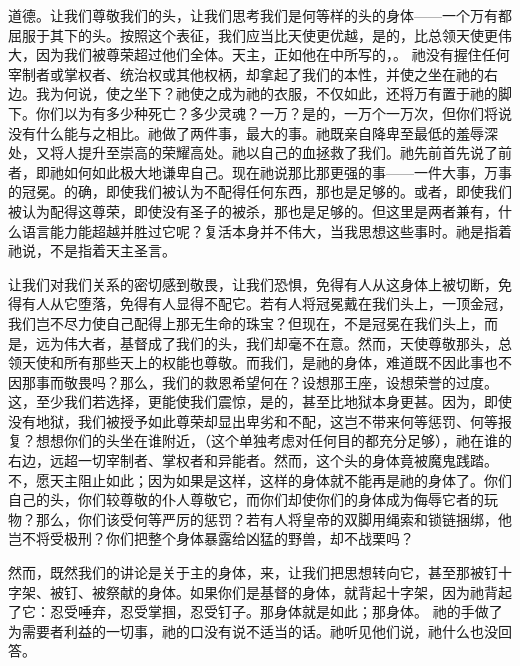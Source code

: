 道德。让我们尊敬我们的头，让我们思考我们是何等样的头的身体——一个万有都屈服于其下的头。按照这个表征，我们应当比天使更优越，是的，比总领天使更伟大，因为我们被尊荣超过他们全体。天主，正如他在中所写的，。 祂没有握住任何宰制者或掌权者、统治权或其他权柄，却拿起了我们的本性，并使之坐在祂的右边。我为何说，使之坐下？祂使之成为祂的衣服，不仅如此，还将万有置于祂的脚下。你们以为有多少种死亡？多少灵魂？一万？是的，一万个一万次，但你们将说没有什么能与之相比。祂做了两件事，最大的事。祂既亲自降卑至最低的羞辱深处，又将人提升至崇高的荣耀高处。祂以自己的血拯救了我们。祂先前首先说了前者，即祂如何如此极大地谦卑自己。现在祂说那比那更强的事——一件大事，万事的冠冕。的确，即使我们被认为不配得任何东西，那也是足够的。或者，即使我们被认为配得这尊荣，即使没有圣子的被杀，那也是足够的。但这里是两者兼有，什么语言能力能超越并胜过它呢？复活本身并不伟大，当我思想这些事时。祂是指着祂说，不是指着天主圣言。\par

让我们对我们关系的密切感到敬畏，让我们恐惧，免得有人从这身体上被切断，免得有人从它堕落，免得有人显得不配它。若有人将冠冕戴在我们头上，一顶金冠，我们岂不尽力使自己配得上那无生命的珠宝？但现在，不是冠冕在我们头上，而是，远为伟大者，基督成了我们的头，我们却毫不在意。然而，天使尊敬那头，总领天使和所有那些天上的权能也尊敬。而我们，是祂的身体，难道既不因此事也不因那事而敬畏吗？那么，我们的救恩希望何在？设想那王座，设想荣誉的过度。这，至少我们若选择，更能使我们震惊，是的，甚至比地狱本身更甚。因为，即使没有地狱，我们被授予如此尊荣却显出卑劣和不配，这岂不带来何等惩罚、何等报复？想想你们的头坐在谁附近，（这个单独考虑对任何目的都充分足够），祂在谁的右边，远超一切宰制者、掌权者和异能者。然而，这个头的身体竟被魔鬼践踏。不，愿天主阻止如此；因为如果是这样，这样的身体就不能再是祂的身体了。你们自己的头，你们较尊敬的仆人尊敬它，而你们却使你们的身体成为侮辱它者的玩物？那么，你们该受何等严厉的惩罚？若有人将皇帝的双脚用绳索和锁链捆绑，他岂不将受极刑？你们把整个身体暴露给凶猛的野兽，却不战栗吗？\par

然而，既然我们的讲论是关于主的身体，来，让我们把思想转向它，甚至那被钉十字架、被钉、被祭献的身体。如果你们是基督的身体，就背起十字架，因为祂背起了它：忍受唾弃，忍受掌掴，忍受钉子。那身体就是如此；那身体。 祂的手做了为需要者利益的一切事，祂的口没有说不适当的话。祂听见他们说，祂什么也没回答。\par

